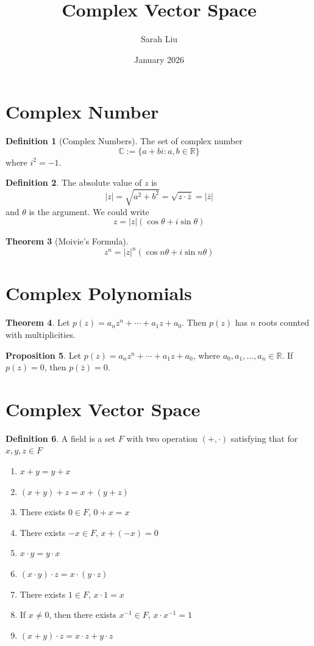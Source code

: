 \documentclass{article}
\title{Complex Vector Space}
\author{Sarah Liu}
\date{January 2026}
\theoremstyle{definition}
\newtheorem{theorem}{Theorem}[section]
\newtheorem{proposition}[theorem]{Proposition}
\newtheorem{definition}[theorem]{Definition}
\theoremstyle{remark}
\begin{document}
\maketitle

\section{Complex Number}

\begin{definition}[Complex Numbers]
    The set of complex number
    \[
    \mathbb{C}:=\{a+bi:a,b\in\mathbb{R}\}
    \]
    where $i^2=-1$.
\end{definition}

\begin{definition}
    The absolute value of $z$ is 
    \[
    |z|=\sqrt{a^2+b^2}=\sqrt{z\cdot\bar{z}}=|\bar{z}|
    \]
    and $\theta$ is the argument. We could write
    \[
    z=|z|(\cos\theta+i\sin\theta)
    \]
\end{definition}

\begin{theorem}[Moivie's Formula]
    \[
    z^n=|z|^n(\cos n\theta+i\sin n\theta)
    \]
\end{theorem}

\section{Complex Polynomials}
\begin{theorem}
    Let $p(z)=a_n z^n+\cdots+a_1 z+a_0$. Then $p(z)$ has $n$ roots counted with multiplicities.
\end{theorem}

\begin{proposition}
    Let $p(z)=a_n z^n+\cdots+a_1 z+a_0$, where $a_0,a_1,\dots,a_n\in\mathbb{R}$.
    If $p(z)=0$, then $p(\bar{z})=0$.
\end{proposition}

\section{Complex Vector Space}
\begin{definition}
    A field is a set $F$ with two operation $(+,\cdot)$ satisfying that for $x,y,z\in F$
    \begin{enumerate}
        \item $x+y=y+x$
        \item $(x+y)+z=x+(y+z)$
        \item There exists $0\in F$, $0+x=x$
        \item There exists $-x\in F$, $x+(-x)=0$
        \item $x\cdot y=y\cdot x$
        \item $(x\cdot y)\cdot z=x\cdot (y\cdot z)$
        \item There exists $1\in F$, $x\cdot 1=x$
        \item If $x\neq 0$, then there exists $x^{-1}\in F$, $x\cdot x^{-1}=1$
        \item $(x+y)\cdot z=x\cdot z+y\cdot z$
    \end{enumerate}
\end{definition}
\end{document}
